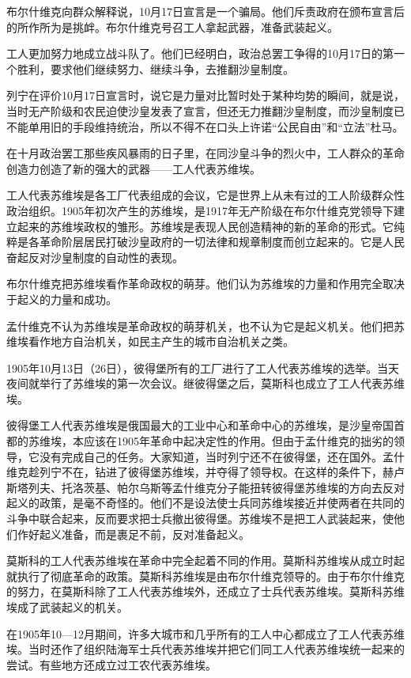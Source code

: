 布尔什维克向群众解释说，10月17日宣言是一个骗局。他们斥责政府在颁布宣言后的所作所为是挑衅。布尔什维克号召工人拿起武器，准备武装起义。

工人更加努力地成立战斗队了。他们已经明白，政治总罢工争得的10月17日的第一个胜利，要求他们继续努力、继续斗争，去推翻沙皇制度。

列宁在评价10月17日宣言时，说它是力量对比暂时处于某种均势的瞬间，就是说，当时无产阶级和农民迫使沙皇发表了宣言，但还无力推翻沙皇制度，而沙皇制度已不能单用旧的手段维持统治，所以不得不在口头上许诺“公民自由”和“立法”杜马。

在十月政治罢工那些疾风暴雨的日子里，在同沙皇斗争的烈火中，工人群众的革命创造力创造了新的强大的武器——工人代表苏维埃。

工人代表苏维埃是各工厂代表组成的会议，它是世界上从未有过的工人阶级群众性政治组织。1905年初次产生的苏维埃，是1917年无产阶级在布尔什维克党领导下建立起来的苏维埃政权的雏形。苏维埃是表现人民创造精神的新的革命的形式。它纯粹是各革命阶层居民打破沙皇政府的一切法律和规章制度而创立起来的。它是人民奋起反对沙皇制度的自动性的表现。

布尔什维克把苏维埃看作革命政权的萌芽。他们认为苏维埃的力量和作用完全取决于起义的力量和成功。

孟什维克不认为苏维埃是革命政权的萌芽机关，也不认为它是起义机关。他们把苏维埃看作地方自治机关，如民主产生的城市自治机关之类。

1905年10月13日（26日），彼得堡所有的工厂进行了工人代表苏维埃的选举。当天夜间就举行了苏维埃的第一次会议。继彼得堡之后，莫斯科也成立了工人代表苏维埃。

彼得堡工人代表苏维埃是俄国最大的工业中心和革命中心的苏维埃，是沙皇帝国首都的苏维埃，本应该在1905年革命中起决定性的作用。但由于孟什维克的拙劣的领导，它没有完成自己的任务。大家知道，当时列宁还不在彼得堡，还在国外。孟什维克趁列宁不在，钻进了彼得堡苏维埃，并夺得了领导权。在这样的条件下，赫卢斯塔列夫、托洛茨基、帕尔乌斯等孟什维克分子能扭转彼得堡苏维埃的方向去反对起义的政策，是毫不奇怪的。他们不是设法使士兵同苏维埃接近并使两者在共同的斗争中联合起来，反而要求把士兵撤出彼得堡。苏维埃不是把工人武装起来，使他们作好起义准备，而是裹足不前，反对准备起义。

莫斯科的工人代表苏维埃在革命中完全起着不同的作用。莫斯科苏维埃从成立时起就执行了彻底革命的政策。莫斯科苏维埃是由布尔什维克领导的。由于布尔什维克的努力，在莫斯科除了工人代表苏维埃外，还成立了士兵代表苏维埃。莫斯科苏维埃成了武装起义的机关。

在1905年10—12月期间，许多大城市和几乎所有的工人中心都成立了工人代表苏维埃。当时还作了组织陆海军士兵代表苏维埃并把它们同工人代表苏维埃统一起来的尝试。有些地方还成立过工农代表苏维埃。


